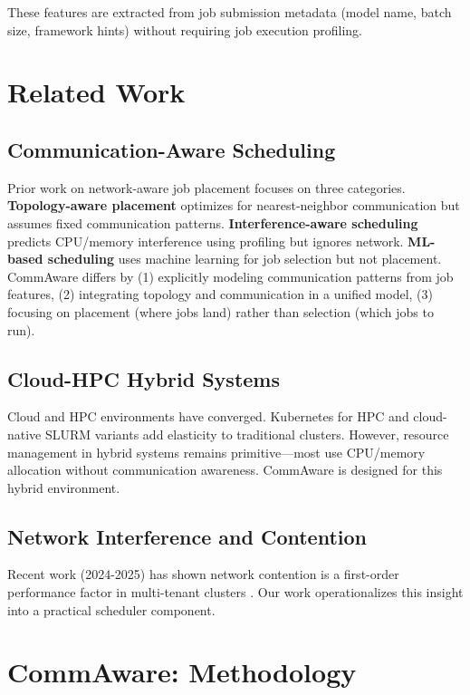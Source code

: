 \documentclass[conference]{IEEEtran}
\begin{document}
These features are extracted from job submission metadata (model name, batch size, framework hints) without requiring job execution profiling.

\section{Related Work}

\subsection{Communication-Aware Scheduling}

Prior work on network-aware job placement focuses on three categories. \textbf{Topology-aware placement} \cite{Topology2013,TopoML2022} optimizes for nearest-neighbor communication but assumes fixed communication patterns. \textbf{Interference-aware scheduling} \cite{Bubble2013,Heracles2015} predicts CPU/memory interference using profiling but ignores network. \textbf{ML-based scheduling} \cite{HeraSched2025,KJS2024} uses machine learning for job selection but not placement. CommAware differs by (1) explicitly modeling communication patterns from job features, (2) integrating topology and communication in a unified model, (3) focusing on placement (where jobs land) rather than selection (which jobs to run).

\subsection{Cloud-HPC Hybrid Systems}

Cloud and HPC environments have converged. Kubernetes for HPC \cite{Kubernetes2024} and cloud-native SLURM variants add elasticity to traditional clusters. However, resource management in hybrid systems remains primitive---most use CPU/memory allocation without communication awareness. CommAware is designed for this hybrid environment.

\subsection{Network Interference and Contention}

Recent work (2024-2025) has shown network contention is a first-order performance factor in multi-tenant clusters \cite{NetCon2024,BandwidthAware2025}. Our work operationalizes this insight into a practical scheduler component.

\section{CommAware: Methodology}
\end{document}
